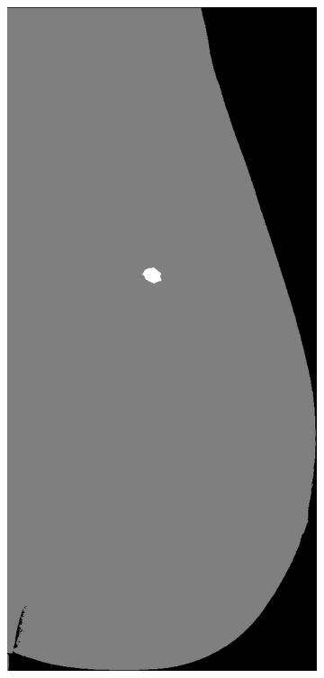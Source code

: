 \documentclass{beamer}
\begin{document}
\begin{frame}
\begin{figure}
\begin{subfigure}{0.134\textwidth}
            \end{subfigure}
            \begin{subfigure}{0.134\textwidth}
	            \centering
		            \includegraphics[width=\textwidth]{plots/examples/label_1.png}

\end{subfigure}
\end{figure}
\end{frame}
\end{document}
